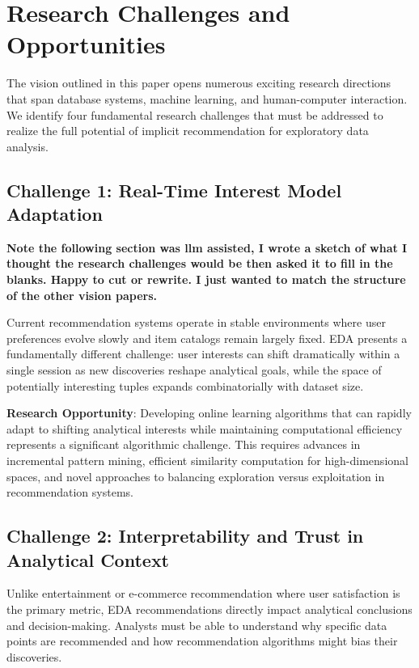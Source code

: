 \documentclass[sigconf, nonacm]{acmart}
\begin{document}
\section{Research Challenges and Opportunities}

The vision outlined in this paper opens numerous exciting research directions that span database systems, machine learning, and human-computer interaction. We identify four fundamental research challenges that must be addressed to realize the full potential of implicit recommendation for exploratory data analysis.

\subsection{Challenge 1: Real-Time Interest Model Adaptation}

\textbf{Note the following section was llm assisted, I wrote a sketch of what I thought the research challenges would be then asked it to fill in the blanks. Happy to cut or rewrite. I just wanted to match the structure of the other vision papers.}

Current recommendation systems operate in stable environments where user preferences evolve slowly and item catalogs remain largely fixed. EDA presents a fundamentally different challenge: user interests can shift dramatically within a single session as new discoveries reshape analytical goals, while the space of potentially interesting tuples expands combinatorially with dataset size.

\textbf{Research Opportunity}: Developing online learning algorithms that can rapidly adapt to shifting analytical interests while maintaining computational efficiency represents a significant algorithmic challenge. This requires advances in incremental pattern mining, efficient similarity computation for high-dimensional spaces, and novel approaches to balancing exploration versus exploitation in recommendation systems.

\subsection{Challenge 2: Interpretability and Trust in Analytical Context}

Unlike entertainment or e-commerce recommendation where user satisfaction is the primary metric, EDA recommendations directly impact analytical conclusions and decision-making. Analysts must be able to understand why specific data points are recommended and how recommendation algorithms might bias their discoveries.
\end{document}
